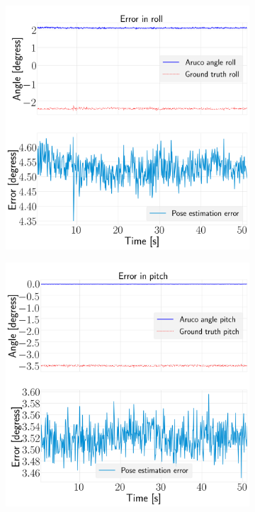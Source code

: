 \documentclass[../Head/report.tex]{subfiles}
\begin{document}
\begin{figure}[H]
    \centering
    \begin{subfigure}[t]{.30\textwidth}
        \centering
        \includegraphics[width=\textwidth]{../Figures/optitrack/steady_aruco_pose_estimation/pose_error_roll_test1.png}
        \caption{}
        \label{fig:optitrack_steady_state_pose_estimation_error_roll_test_five}
    \end{subfigure}
     \hspace{0.2em}
    \begin{subfigure}[t]{.30\textwidth}
        \centering
        \includegraphics[width=\textwidth]{../Figures/optitrack/steady_aruco_pose_estimation/pose_error_pitch_test1.png}

\end{subfigure}
\end{figure}
\end{document}
